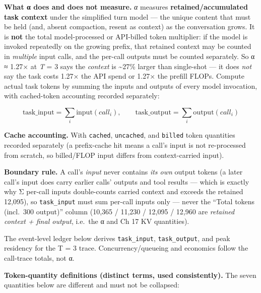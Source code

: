 \textbf{What α does and does not measure.} \emph{α} measures
\textbf{retained/accumulated task context} under the simplified turn
model --- the unique content that must be held (and, absent compaction,
resent as context) as the conversation grows. It is \textbf{not} the
total model-processed or API-billed token multiplier: if the model is
invoked repeatedly on the growing prefix, that retained context may be
counted in \emph{multiple} input calls, and the per-call outputs must be
counted separately. So α ≈ 1.27× at \emph{T} = 3 says the \emph{context}
is \textasciitilde27\% larger than single-shot --- it does \emph{not}
say the task costs 1.27× the API spend or 1.27× the prefill FLOPs.
Compute actual task tokens by summing the inputs and outputs of every
model invocation, with cached-token accounting recorded separately:

\[\text{task\_input} = \sum_i \text{input}(call_i), \qquad \text{task\_output} = \sum_i \text{output}(call_i)\]

\textbf{Cache accounting.} With \texttt{cached}, \texttt{uncached}, and
\texttt{billed} token quantities recorded separately (a prefix-cache hit
means a call's input is not re-processed from scratch, so billed/FLOP
input differs from context-carried input).

\textbf{Boundary rule.} A call's \emph{input} never contains \emph{its
own} output tokens (a later call's input does carry earlier calls'
outputs and tool results --- which is exactly why Σ per-call inputs
double-counts carried context and exceeds the retained 12,095), so
\texttt{task\_input} must sum per-call inputs only --- never the ``Total
tokens (incl.~300 output)'' column (10,365 / 11,230 / 12,095 / 12,960
are \emph{retained context + final output}, i.e.~the α and Ch 17 KV
quantities).

The event-level ledger below derives \texttt{task\_input},
\texttt{task\_output}, and peak residency for the T = 3 trace.
Concurrency/queueing and economics follow the call-trace totals, not α.

\textbf{Token-quantity definitions (distinct terms, used consistently).}
The seven quantities below are different and must not be collapsed:


